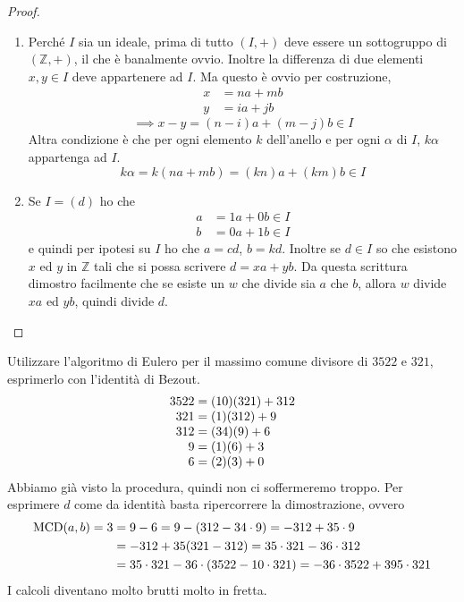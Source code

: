 \begin{proof}\
	\begin{enumerate}
		\item Perché $I$ sia un ideale, prima di tutto $(I,+)$ deve essere un sottogruppo di $(\mathbb{Z},+)$, il che è banalmente ovvio. Inoltre la differenza di due elementi $x,y \in I$ deve appartenere ad $I$. Ma questo è ovvio per costruzione,
		\begin{align*}
		x &= na+mb \\y&=ia+jb
		\end{align*}
		\begin{equation*}
		\implies x-y = (n-i)a+(m-j)b \in I
		\end{equation*}
		Altra condizione è che per ogni elemento $k$ dell'anello e per ogni $\alpha$ di $I$, $k\alpha$ appartenga ad $I$.
		\begin{equation*}
		k\alpha = k(na+mb)=(kn)a+(km)b\in I
		\end{equation*}
		\item Se $I=(d)$ ho che
		\begin{align*}
		a&=1a+0b \in I\\ b&=0a+1b \in I
		\end{align*}
		e quindi per ipotesi su $I$ ho che $a=cd$, $b=kd$. Inoltre se $d \in I$ so che esistono $x$ ed $y$ in $\mathbb{Z}$ tali che si possa scrivere $d=xa+yb$.
		Da questa scrittura dimostro facilmente che se esiste un $w$ che divide sia $a$ che $b$, allora $w$ divide $xa$ ed $yb$, quindi divide $d$. 
	\end{enumerate}
\end{proof}
\begin{esempio}
	Utilizzare l'algoritmo di Eulero per il massimo comune divisore di $3522$ e $321$, esprimerlo con l'identità di Bezout.
	\begin{equation*}
		\arraycolsep=1.4pt
		\begin{array}{rl}
			3522 &= (10)(321)+312\\
			321 &= (1)(312)+9\\
			312 &= (34)(9)+6\\
			9 &=(1)(6)+3\\
			6 &=(2)(3)+0
		\end{array}
	\end{equation*}
	Abbiamo già visto la procedura, quindi non ci soffermeremo troppo. Per esprimere $d$ come da identità basta ripercorrere la dimostrazione, ovvero 
	\begin{align*}
	\operatorname{\mathrm{MCD}}(a,b)=3&= 9-6=9-(312-34\cdot9)=-312+35\cdot9\\
	&= -312+35(321-312)=35\cdot321-36\cdot312\\
	&= 35\cdot321-36\cdot(3522-10\cdot321)=-36\cdot3522+395\cdot321
	\end{align*}
	I calcoli diventano molto brutti molto in fretta.
\end{esempio}
